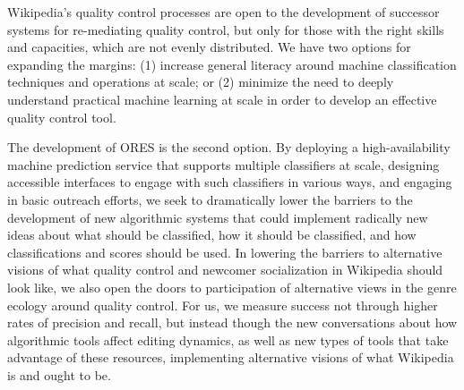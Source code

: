 Wikipedia's quality control processes are open to the development of successor systems for re-mediating quality control, but only for those with the right skills and capacities, which are not evenly distributed. We have two options for expanding the margins: (1) increase general literacy around machine classification techniques and operations at scale; or (2) minimize the need to deeply understand practical machine learning at scale in order to develop an effective quality control tool.

The development of ORES is the second option.  By deploying a high-availability machine prediction service that supports multiple classifiers at scale, designing accessible interfaces to engage with such classifiers in various ways, and engaging in basic outreach efforts, we seek to dramatically lower the barriers to the development of new algorithmic systems that could implement radically new ideas about what should be classified, how it should be classified, and how classifications and scores should be used. In lowering the barriers to alternative visions of what quality control and newcomer socialization in Wikipedia should look like, we also open the doors to participation of alternative views in the genre ecology around quality control.  For us, we measure success not through higher rates of precision and recall, but instead though the new conversations about how algorithmic tools affect editing dynamics, as well as new types of tools that take advantage of these resources, implementing alternative visions of what Wikipedia is and ought to be.
